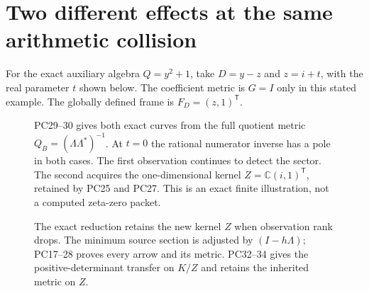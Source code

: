 \documentclass[11pt]{article}
\begin{document}
\section*{Two different effects at the same arithmetic collision}
For the exact auxiliary algebra $Q=y^2+1$, take $D=y-z$ and
$z=i+t$, with the real parameter $t$ shown below.
The coefficient metric is $G=I$ only in this stated example.
The globally defined frame is $F_D=(z,1)^{\mathsf T}$.
\begin{figure}[ht]\centering
{}
\caption{PC29--30 gives both exact curves from the full quotient
metric $Q_B=(\Lambda\Lambda^*)^{-1}$. At $t=0$ the rational
numerator inverse has a pole in both cases. The first observation
continues to detect the sector. The second acquires the one-dimensional
kernel $Z=\mathbb C(i,1)^{\mathsf T}$, retained by PC25 and PC27.
This is an exact finite illustration, not a computed zeta-zero packet.}
\end{figure}
\begin{figure}[ht]\centering
{}
\caption{The exact reduction retains the new kernel $Z$ when
observation rank drops. The minimum source section is adjusted by
$(I-h\Lambda)$; PC17--28 proves every arrow and its metric.
PC32--34 gives the positive-determinant transfer on $K/Z$ and
retains the inherited metric on $Z$.}
\end{figure}\clearpage
\end{document}
